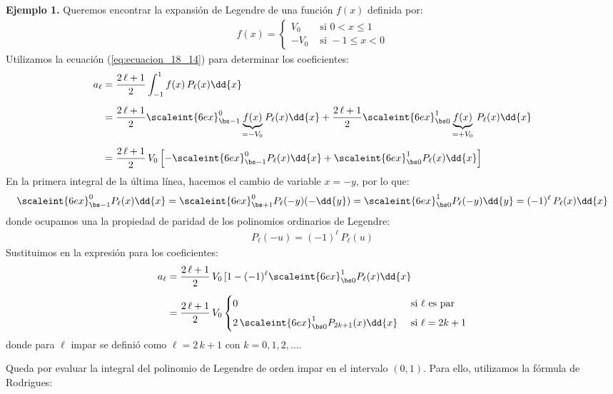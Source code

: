 \textbf{Ejemplo 1.} Queremos encontrar la expansión de Legendre de una función $f(x)$ definida por:
\begin{align*}
f(x) = \begin{cases}
V_{0} & \mbox{ si } 0 < x \leq 1 \\[0.5em]
- V_{0} & \mbox{ si } -1 \leq x < 0
\end{cases}
\end{align*}
Utilizamos la ecuación (\ref{eq:ecuacion_18_14}) para determinar los coeficientes:
\begin{align*}
a_{\ell} &= \dfrac{2 \, \ell + 1}{2} \int_{-1}^{1} f(x) \, P_{\ell} (x) \dd{x} \\[0.5em]
&= \dfrac{2 \, \ell + 1}{2} \scaleint{6ex}_{\bs -1}^{0} \underbrace{f(x)}_{=-V_0}  P_{\ell} (x) \dd{x} + \dfrac{2 \, \ell + 1}{2} \scaleint{6ex}_{\bs 0}^{1} \underbrace{f(x)}_{=+V_0} \, P_{\ell} (x) \dd{x} \\[0.5em]
&= \dfrac{2 \, \ell + 1}{2} \, V_{0} \left[ - \scaleint{6ex}_{\bs -1}^{0} P_{\ell} (x) \dd{x} + \scaleint{6ex}_{\bs 0}^{1} P_{\ell} (x) \dd{x} \right]
\end{align*}
En la primera integral de la última línea, hacemos el cambio de variable $x = -y$, por lo que:
\begin{align*}
\scaleint{6ex}_{\bs -1}^{0} P_{\ell} (x) \dd{x} = \scaleint{6ex}_{\bs +1}^{0} P_{\ell} (-y) (-\dd{y}) = \scaleint{6ex}_{\bs 0}^{1} P_{\ell} (-y) \dd{y} = (-1)^{\ell} \, P_{\ell} (x) \dd{x}
\end{align*}
donde ocupamos una la propiedad de paridad de los polinomios ordinarios de Legendre:
\begin{align*}
P_{\ell} (-u) = (-1)^{\ell} \, P_{\ell} (u)
\end{align*}
Sustituimos en la expresión para los coeficientes:
\begin{align*}
a_{\ell} &= \dfrac{2 \, \ell + 1}{2} \, V_{0} \,  [1 - (-1)^{\ell} \scaleint{6ex}_{\bs 0}^{1} P_{\ell} (x) \dd{x} \\[0.5em]
&= \dfrac{2 \, \ell + 1}{2} \, V_{0} \begin{cases}
0 & \mbox{ si } \ell \mbox{ es par} \\[0.5em]
2 \, \displaystyle \scaleint{6ex}_{\bs 0}^{1} P_{2k+1} (x) \dd{x} & \mbox{ si } \ell = 2 k + 1 
\end{cases}
\end{align*}
donde para $\ell$ impar se definió como $\ell = 2 \, k + 1$ con $k = 0, 1, 2, \ldots$.
\par
Queda por evaluar la integral del polinomio de Legendre de orden impar en el intervalo $(0, 1)$. Para ello, utilizamos la fórmula de Rodrigues:

